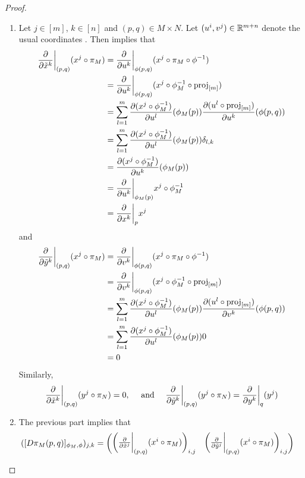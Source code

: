 \documentclass{book}
\begin{document}
	
	\begin{proof}\
		\begin{enumerate}
			\item Let $j \in [m]$, $k \in [n]$ and $(p,q) \in M \times N$. Let $(u^i,v^j) \in \mathbb{R}^{m+n}$ denote the usual coordinates . Then  implies that
			\begin{align*}
				\frac{\partial }{\partial \tilde{x}^k} \bigg|_{(p,q)} ( x^j \circ \pi_M )
				& = \frac{\partial }{\partial u^k} \bigg|_{\phi(p,q)} (x^j \circ \pi_M \circ \phi^{-1}) \\
				& = \frac{\partial }{\partial u^k} \bigg|_{\phi(p,q)} (x^j \circ \phi_M^{-1} \circ \operatorname{\text{proj}}_{[m]}) \\
				& = \sum_{l=1}^m \frac{\partial (x^j \circ \phi_M^{-1})}{\partial u^l}(\phi_M(p)) \frac{\partial (u^l \circ \operatorname{\text{proj}}_{[m]})}{\partial u^k}(\phi(p,q)) \\ 
				& = \sum_{l=1}^m \frac{\partial (x^j \circ \phi_M^{-1})}{\partial u^l}(\phi_M(p)) \delta_{l,k} \\ 
				& = \frac{\partial (x^j \circ \phi_M^{-1})}{\partial u^k}(\phi_M(p)) \\
				& = \frac{\partial }{\partial u^k} \bigg|_{\phi_M(p)} x^j \circ \phi_M^{-1} \\
				& = \frac{\partial }{\partial x^k} \bigg|_{p} x^j
			\end{align*}
			and 
			\begin{align*}
				\frac{\partial }{\partial \tilde{y}^k} \bigg|_{(p,q)} ( x^j \circ \pi_M )
				& = \frac{\partial }{\partial v^k} \bigg|_{\phi(p,q)} (x^j \circ \pi_M \circ \phi^{-1}) \\
				& = \frac{\partial }{\partial v^k} \bigg|_{\phi(p,q)} (x^j \circ \phi_M^{-1} \circ \operatorname{\text{proj}}_{[m]}) \\
				& = \sum_{l=1}^m \frac{\partial (x^j \circ \phi_M^{-1})}{\partial u^l}(\phi_M(p)) \frac{\partial (u^l \circ \operatorname{\text{proj}}_{[m]})}{\partial v^k}(\phi(p,q)) \\ 
				& = \sum_{l=1}^m \frac{\partial (x^j \circ \phi_M^{-1})}{\partial u^l}(\phi_M(p)) 0 \\ 
				& = 0
			\end{align*}
			Similarly, 
			$$\frac{\partial }{\partial \tilde{x}^k} \bigg|_{(p,q)} ( y^j \circ \pi_N ) = 0, \quad \text{ and } \quad  \frac{\partial }{\partial \tilde{y}^k} \bigg|_{(p,q)} ( y^j \circ \pi_N ) =  \frac{\partial}{\partial y^k} \bigg|_q (y^j)$$
			\item The previous part implies that
			\begin{align*}
				([D \pi_M (p,q)]_{\phi_M, \phi})_{j,k} 
				& = 
				\begin{pmatrix}
					\bigg(\frac{\partial }{ \partial \tilde{x}^j} \bigg|_{(p, q)} (x^i \circ \pi_M) \bigg)_{i,j} & \bigg( \frac{\partial }{ \partial \tilde{y}^j} \bigg|_{(p, q)} (x^i \circ \pi_M) \bigg)_{i,j}

\end{pmatrix}
\end{align*}
\end{enumerate}
\end{proof}
\end{document}
